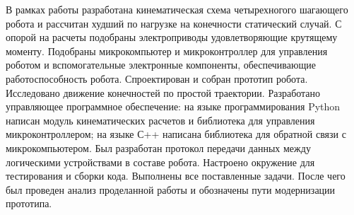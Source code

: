 
В рамках работы разработана кинематическая схема четырехногого шагающего робота и рассчитан худший по нагрузке на конечности статический случай. С опорой на расчеты подобраны электроприводы удовлетворяющие крутящему моменту. Подобраны микрокомпьютер и микроконтроллер для управления роботом и вспомогательные электронные компоненты, обеспечивающие работоспособность робота. Спроектирован и собран прототип робота. Исследовано движение конечностей по простой траектории. Разработано управляющее программное обеспечение: на языке программирования Python написан модуль кинематических расчетов и библиотека для управления микроконтроллером; на языке С++ написана библиотека для обратной связи с микрокомпьютером. Был разработан протокол передачи данных между логическими устройствами в составе робота. Настроено окружение для тестирования и сборки кода. Выполнены все поставленные задачи. После чего был проведен анализ проделанной работы и обозначены пути модернизации прототипа.